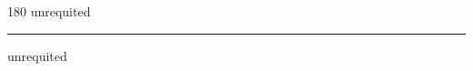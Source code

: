 
\begin{frame}
\begin{center}
\begin{turn}{180}
{\fontsize{2.5cm}{1em}\selectfont unrequited}
\end{turn}
\vspace{1em}\par  
\hrule
\vspace{1em}\par  
{\fontsize{2.5cm}{1em}\selectfont unrequited}
\end{center}
\end{frame}

